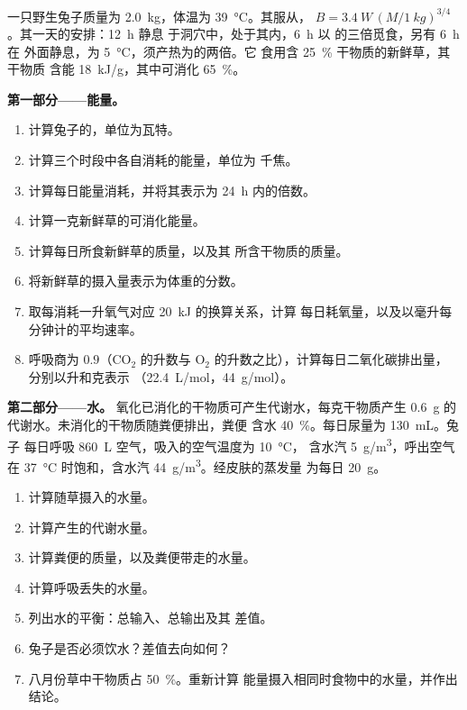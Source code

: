 \begin{problem}
\label{pb:b1:mammal-organization:1}
一只野生兔子质量为 \qty{2.0}{kg}，体温为
\qty{39}{\celsius}。其服从，
$B = \qty{3.4}{W}\,(M/\qty{1}{kg})^{3/4}$。其一天的安排：\qty{12}{h} 静息
于洞穴中，处于其内，\qty{6}{h} 以
的三倍觅食，另有 \qty{6}{h} 在
外面静息，为 \qty{5}{\celsius}，须产热为的两倍。它
食用含 \qty{25}{\%} 干物质的新鲜草，其干物质
含能 \qty{18}{kJ/g}，其中可消化 \qty{65}{\%}。

\medskip
\noindent\textbf{第一部分——能量。}
\begin{enumerate}
  \item 计算兔子的，单位为瓦特。
  \item 计算三个时段中各自消耗的能量，单位为
        千焦。
  \item 计算每日能量消耗，并将其表示为
        \qty{24}{h} 内的倍数。
  \item 计算一克新鲜草的可消化能量。
  \item 计算每日所食新鲜草的质量，以及其
        所含干物质的质量。
  \item 将新鲜草的摄入量表示为体重的分数。
  \item 取每消耗一升氧气对应 \qty{20}{kJ} 的换算关系，计算
        每日耗氧量，以及以毫升每
        分钟计的平均速率。
  \item 呼吸商为 $0.9$（$\mathrm{CO_2}$ 的升数与
        $\mathrm{O_2}$ 的升数之比），计算每日二氧化碳排出量，
        分别以升和克表示
        （\qty{22.4}{L/mol}，\qty{44}{g/mol}）。
\end{enumerate}

\medskip
\noindent\textbf{第二部分——水。}
氧化已消化的干物质可产生代谢水，每克干物质产生 \qty{0.6}{g}
的代谢水。未消化的干物质随粪便排出，粪便
含水 \qty{40}{\%}。每日尿量为 \qty{130}{mL}。兔子
每日呼吸 \qty{860}{L} 空气，吸入的空气温度为 \qty{10}{\celsius}，
含水汽 \qty{5}{g/m^3}，呼出空气在
\qty{37}{\celsius} 时饱和，含水汽 \qty{44}{g/m^3}。经皮肤的蒸发量
为每日 \qty{20}{g}。
\begin{enumerate}[resume]
  \item 计算随草摄入的水量。
  \item 计算产生的代谢水量。
  \item 计算粪便的质量，以及粪便带走的水量。
  \item 计算呼吸丢失的水量。
  \item 列出水的平衡：总输入、总输出及其
        差值。
  \item 兔子是否必须饮水？差值去向如何？
  \item 八月份草中干物质占 \qty{50}{\%}。重新计算
        能量摄入相同时食物中的水量，并作出结论。
\end{enumerate}


\end{problem}
